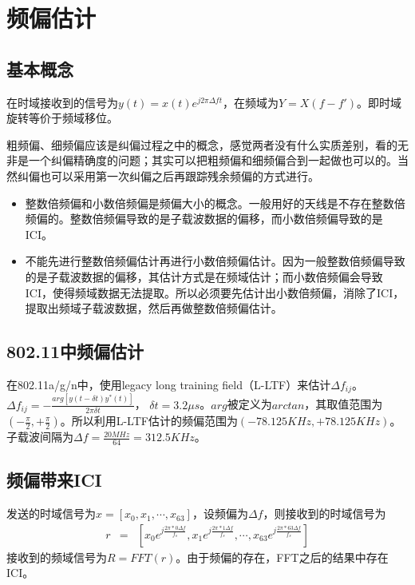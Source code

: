\section{频偏估计}

\subsection{基本概念}
在时域接收到的信号为$y(t)=x(t) e^{j2 \pi \Delta f t}$，在频域为$Y = X(f - f')$。即时域旋转等价于频域移位。

粗频偏、细频偏应该是纠偏过程之中的概念，感觉两者没有什么实质差别，看的无非是一个纠偏精确度的问题；其实可以把粗频偏和细频偏合到一起做也可以的。当然纠偏也可以采用第一次纠偏之后再跟踪残余频偏的方式进行。
\begin{itemize}
\item 整数倍频偏和小数倍频偏是频偏大小的概念。一般用好的天线是不存在整数倍频偏的。整数倍频偏导致的是子载波数据的偏移，而小数倍频偏导致的是ICI。
\item 不能先进行整数倍频偏估计再进行小数倍频偏估计。因为一般整数倍频偏导致的是子载波数据的偏移，其估计方式是在频域估计；而小数倍频偏会导致ICI，使得频域数据无法提取。所以必须要先估计出小数倍频偏，消除了ICI，提取出频域子载波数据，然后再做整数倍频偏估计。
\end{itemize}


\subsection{802.11中频偏估计}
在802.11a/g/n中，使用legacy long training field（L-LTF）来估计$\Delta f_{ij}$。
$\Delta f_{ij} = -\frac{arg[ y(t - \delta t)y^{*}(t)  ]}{2 \pi \delta t}$， $\delta t = 3.2 \mu s$。$arg$被定义为$arctan$，其取值范围为$(-\frac{\pi}{2}, +\frac{\pi}{2})$。所以利用L-LTF估计的频偏范围为$(-78.125KHz, +78.125KHz)$。
子载波间隔为$\Delta f = \frac{20MHz}{64} = 312.5KHz$。

\subsection{频偏带来ICI}
发送的时域信号为$x=[x_{0}, x_{1}, \cdots, x_{63}]$，设频偏为$\Delta f$，则接收到的时域信号为
\begin{eqnarray}
r&=&[x_{0}e^{j\frac{2\pi*0\Delta f}{f_{s}}}, x_{1}e^{j\frac{2\pi*1\Delta f}{f_{s}}}, \cdots, x_{63}e^{j\frac{2\pi*63\Delta f}{f_{s}}}]
\end{eqnarray}
接收到的频域信号为$R=FFT(r)$。由于频偏的存在，FFT之后的结果中存在ICI。

